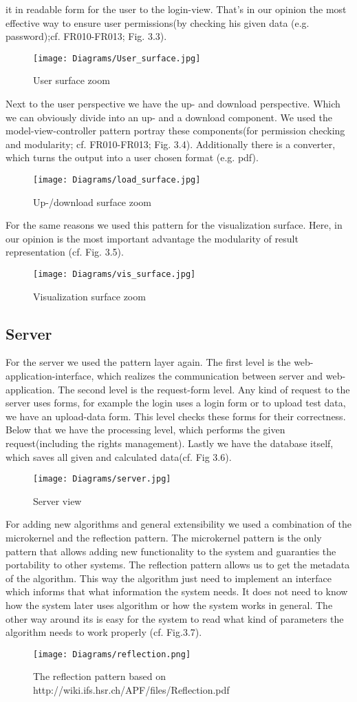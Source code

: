\documentclass{book}
\begin{document}
it in readable form for the user to the login-view. That's in our opinion the most effective way to ensure user permissions(by checking his given data (e.g. password);cf. FR010-FR013; Fig. 3.3).
\begin{figure}[H]
\centering
\texttt{[image: Diagrams/User\_surface.jpg]}
\caption{User surface zoom}
\label{Fig. 4}
\end{figure}
Next to the user perspective we have the up- and download perspective. Which we can obviously divide into an up- and a download component. We used the model-view-controller pattern portray these components(for permission checking and modularity; cf. FR010-FR013; Fig. 3.4). Additionally there is a converter, which turns the output into a user chosen format (e.g. pdf).
\begin{figure}[H]
\centering
\texttt{[image: Diagrams/load\_surface.jpg]}
\caption{Up-/download surface zoom}
\label{Fig. 5}
\end{figure}
For the same reasons we used this pattern for the visualization surface. Here, in our opinion is the most important advantage the modularity of result representation (cf. Fig. 3.5).
\begin{figure}[H]
\centering
\texttt{[image: Diagrams/vis\_surface.jpg]}
\caption{Visualization surface zoom}
\label{Fig. 6}
\end{figure}
\subsection{Server}
For the server we used the pattern layer again. The first level is the web-application-interface, which realizes the communication between server and web-application. The second level is the request-form level. Any kind of request to the server uses forms, for example the login uses a login form or to upload test data, we have an upload-data form. This level checks these forms for their correctness. Below that we have the processing level, which performs the given request(including the rights management). Lastly we have the database itself, which saves all given and calculated data(cf. Fig 3.6).
\begin{figure}[H]
\centering
\texttt{[image: Diagrams/server.jpg]}
\caption{Server view}
\label{Fig. 7}
\end{figure}
For adding new algorithms and general extensibility we used a combination of the microkernel and the reflection pattern. The microkernel pattern is the only pattern that allows adding new functionality to the system and guaranties the portability to other systems. The reflection pattern allows us to get the metadata of the algorithm.
This way the algorithm just need to implement an interface which informs that what information the system needs. It does not need to know how the system later uses algorithm or how the system works in general. The other way around its is easy for the system to read what kind of parameters the algorithm needs to work properly (cf. Fig.3.7).
\begin{figure}[H]
\centering
\texttt{[image: Diagrams/reflection.png]}
\caption{The reflection pattern based on http://wiki.ifs.hsr.ch/APF/files/Reflection.pdf}
\label{Fig. 8}
\end{figure}
\end{document}
